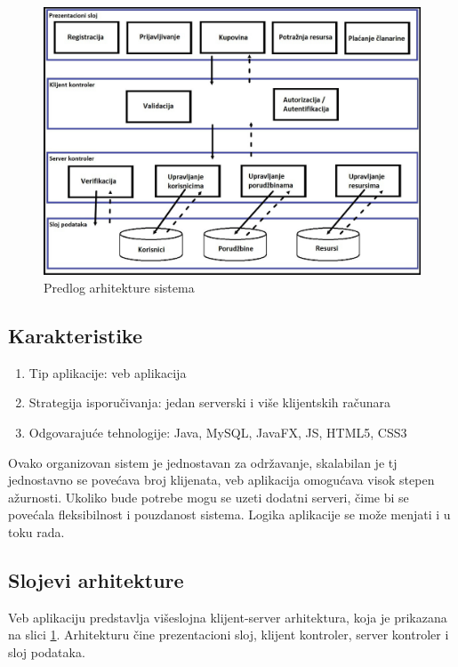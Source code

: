\documentclass[a4paper, oneside]{article}
\begin{document}
\begin{figure}[h!]
    \centering
    \includegraphics[scale=0.335]{images/Predlog_arhitekture.jpg}
    \caption{Predlog arhitekture sistema}
    \label{predlog_arhitekture_sistema}
\end{figure}

\subsection{Karakteristike}

\begin{enumerate}
    \item Tip aplikacije: veb aplikacija
    \item Strategija isporučivanja: jedan serverski i više klijentskih računara
    \item Odgovarajuće tehnologije: Java, MySQL, JavaFX, JS, HTML5, CSS3
\end{enumerate}

\indent Ovako organizovan sistem je jednostavan za održavanje, skalabilan je tj jednostavno se povećava broj klijenata, veb aplikacija omogućava visok stepen ažurnosti. Ukoliko bude potrebe mogu se uzeti dodatni serveri, čime bi se povećala fleksibilnost i pouzdanost sistema. Logika aplikacije se može menjati i u toku rada.

\subsection{Slojevi arhitekture}

\indent Veb aplikaciju predstavlja višeslojna klijent-server arhitektura, koja je prikazana na slici \ref{predlog_arhitekture_sistema}. Arhitekturu čine prezentacioni sloj, klijent kontroler, server kontroler i sloj podataka.
\end{document}
